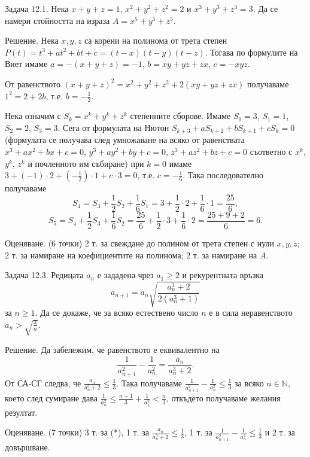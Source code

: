 
Задача 12.1. Нека $x+y+z=1$, $x^{2}+y^{2}+z^{2}=2$ и $x^{3}+y^{3}+z^{3}=3$. Да се намери стойността на израза $A=x^{5}+y^{5}+z^{5}$.

Решение. Нека $x, y, z$ са корени на полинома от трета степен $P(t)=t^{3}+a t^{2}+b t+c=(t-x)(t-y)(t-z)$. Тогава по формулите на Виет имаме $a=-(x+y+z)=-1$, $b=x y+y z+z x$, $c=-x y z$.

От равенството $(x+y+z)^{2}=x^{2}+y^{2}+z^{2}+2(x y+y z+z x)$ получаваме $1^{2}=2+2 b$, т.е. $b=-\frac{1}{2}$.

Нека означим с $S_{k}=x^{k}+y^{k}+z^{k}$ степенните сборове. Имаме $S_{0}=3$, $S_{1}=1$, $S_{2}=2$, $S_{3}=3$. Сега от формулата на Нютон $S_{k+3}+a S_{k+2}+b S_{k+1}+c S_{k}=0$ (формулата се получава след умножаване на всяко от равенствата $x^{3}+a x^{2}+b x+c=0$, $y^{3}+a y^{2}+b y+c=0$, $z^{3}+a z^{2}+b z+c=0$ съответно с $x^{k}$, $y^{k}$, $z^{k}$ и почленното им събиране) при $k=0$ имаме $3+(-1) \cdot 2+\left(-\frac{1}{2}\right) \cdot 1+c \cdot 3=0$, т.е. $c=-\frac{1}{6}$. Така последователно получаваме
$$
S_{4}=S_{3}+\frac{1}{2} S_{2}+\frac{1}{6} S_{1}=3+\frac{1}{2} \cdot 2+\frac{1}{6} \cdot 1=\frac{25}{6},
$$
$$
S_{5}=S_{4}+\frac{1}{2} S_{3}+\frac{1}{6} S_{2}=\frac{25}{6}+\frac{1}{2} \cdot 3+\frac{1}{6} \cdot 2=\frac{25+9+2}{6}=6.
$$

Оценяване. (6 точки) 2 т. за свеждане до полином от трета степен с нули $x, y, z$; 2 т. за намиране на коефициентите на полинома; 2 т. за намиране на $A$.

Задача 12.3. Редицата $a_{n}$ е зададена чрез $a_{1} \geq 2$ и рекурентната връзка
$$
a_{n+1}=a_{n} \sqrt{\frac{a_{n}^{3}+2}{2\left(a_{n}^{3}+1\right)}}
$$
за $n \geq 1$. Да се докаже, че за всяко естествено число $n$ е в сила неравенството $a_{n}>\sqrt{\frac{3}{n}}$.

Решение. Да забележим, че равенството е еквивалентно на
$$
\frac{1}{a_{n+1}^{2}}-\frac{1}{a_{n}^{2}}=\frac{a_{n}}{a_{n}^{3}+2}. \tag{*}
$$
От СА-СГ следва, че $\frac{a_{n}}{a_{n}^{3}+2} \leq \frac{1}{3}$. Така получаваме $\frac{1}{a_{n+1}^{2}}-\frac{1}{a_{n}^{2}} \leq \frac{1}{3}$ за всяко $n \in \mathbb{N}$, което след сумиране дава $\frac{1}{a_{n}^{2}} \leq \frac{n-1}{3}+\frac{1}{a_{1}^{2}}<\frac{n}{3}$, откъдето получаваме желания резултат.

Оценяване. (7 точки) 3 т. за (*), 1 т. за $\frac{a_{n}}{a_{n}^{3}+2} \leq \frac{1}{3}$, 1 т. за $\frac{1}{a_{n+1}^{2}}-\frac{1}{a_{n}^{2}} \leq \frac{1}{3}$ и 2 т. за довършване.
